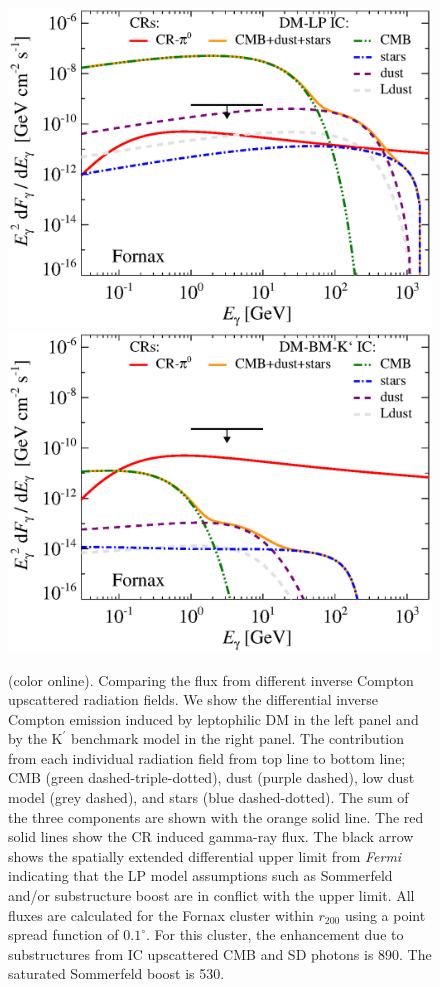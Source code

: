 \documentclass[10pt,aps,pra,reprint,amsmath,amsfonts,amssymb,showpacs,nofootinbib,floatfix]{revtex4-1}
\newcommand{\Fermi}{{\em Fermi}\xspace}
\newcommand{\rmn}{\mathrm}
\newcommand{\Kp}{\rmn{K}^\prime}
\newcommand{\degs}{^\circ}
\newcommand{\colo}{(color online). }
\newcommand{\rvir}{r_{200}}
\begin{document}
\begin{figure}
\begin{minipage}{2.0\columnwidth}
\includegraphics[width=0.49\columnwidth]{figures/flux.IRcomp.v14.0.1deg.1.6T.SubMass.elmu.SF700.noMW.woGal.bw.eps}
\includegraphics[width=0.49\columnwidth]{figures/flux.IRcomp.BMv14.0.1deg.SubMass.noMW.woGal.bw.eps}
\caption{\colo Comparing the flux from different inverse
  Compton upscattered radiation fields. We show the differential
  inverse Compton emission induced by leptophilic DM in the left panel
  and by the $\Kp$ benchmark model in the right panel. The
  contribution from each individual radiation field from top line to
  bottom line; CMB (green dashed-triple-dotted), dust (purple dashed),
  low dust model (grey dashed), and stars (blue dashed-dotted). The
  sum of the three components are shown with the orange solid
  line. The red solid lines show the CR induced gamma-ray flux. The
  black arrow shows the spatially extended differential upper limit
  from \Fermi \protect \cite{2010ApJ...717L..71A} indicating that the
  LP model assumptions such as Sommerfeld and/or substructure boost
  are in conflict with the upper limit. All fluxes are calculated for
  the Fornax cluster within $\rvir$ using a point spread function of
  $0.1\degs$. For this cluster, the enhancement due to substructures
  from IC upscattered CMB and SD photons is 890. The saturated
  Sommerfeld boost is 530.}
 \label{fig:IR_comp}
\end{minipage}
\end{figure}
\end{document}
